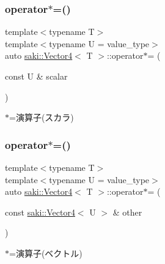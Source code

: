 \subsubsection{\texorpdfstring{operator$\ast$=()}{operator*=()}\hspace{0.1cm}{\footnotesize\ttfamily [1/2]}}
{\footnotesize\ttfamily template$<$typename T$>$ \\
template$<$typename U  = value\+\_\+type$>$ \\
auto \mbox{\hyperlink{classsaki_1_1_vector4}{saki\+::\+Vector4}}$<$ T $>$\+::operator$\ast$= (\begin{DoxyParamCaption}\item[{const U \&}]{scalar }\end{DoxyParamCaption})\hspace{0.3cm}{\ttfamily [inline]}}



$\ast$=演算子(スカラ) 

\mbox{\label{classsaki_1_1_vector4_ad456668b67b242d856cf92f79ff454b3}} 
\subsubsection{\texorpdfstring{operator$\ast$=()}{operator*=()}\hspace{0.1cm}{\footnotesize\ttfamily [2/2]}}
{\footnotesize\ttfamily template$<$typename T$>$ \\
template$<$typename U  = value\+\_\+type$>$ \\
auto \mbox{\hyperlink{classsaki_1_1_vector4}{saki\+::\+Vector4}}$<$ T $>$\+::operator$\ast$= (\begin{DoxyParamCaption}\item[{const \mbox{\hyperlink{classsaki_1_1_vector4}{saki\+::\+Vector4}}$<$ U $>$ \&}]{other }\end{DoxyParamCaption})\hspace{0.3cm}{\ttfamily [inline]}}



$\ast$=演算子(ベクトル) 

\mbox{\label{classsaki_1_1_vector4_a3983864f4c422dd7b0d88618acddf8d9}} 
